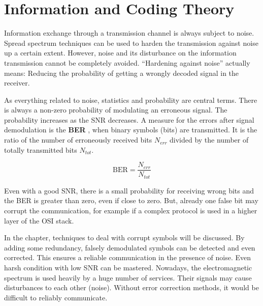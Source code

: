 %
%
%

\chapter{Information and Coding Theory}

\begin{refsection}

Information exchange through a transmission channel is always subject to noise. Spread spectrum techniques can be used to harden the transmission against noise up a certain extent. However, noise and its disturbance on the information transmission cannot be completely avoided. ``Hardening against noise'' actually means: Reducing the probability of getting a wrongly decoded signal in the receiver.

As everything related to noise, statistics and probability are central terms. There is always a non-zero probability of modulating an erroneous signal. The probability increases as the \ac{SNR} decreases. A measure for the errors after signal demodulation is the \textbf{\acf{BER}} , when binary symbols (bits) are transmitted. It is the ratio of the number of erroneously received bits $N_{err}$ divided by the number of totally transmitted bits $N_{tot}$.

\begin{equation}
	\mathrm{BER} = \frac{N_{err}}{N_{tot}}
\end{equation}
%

Even with a good \ac{SNR}, there is a small probability for receiving wrong bits and the \ac{BER} is greater than zero, even if close to zero. But, already one false bit may corrupt the communication, for example if a complex protocol is used in a higher layer of the \ac{OSI} stack.

In the chapter, techniques to deal with corrupt symbols will be discussed. By adding some redundancy, falsely demodulated symbols can be detected and even corrected. This ensures a reliable communication in the presence of noise. Even harsh condition with low \ac{SNR} can be mastered. Nowadays, the electromagnetic spectrum is used heavily by a huge number of services. Their signals may cause disturbances to each other (noise). Without error correction methods, it would be difficult to reliably communicate.


\end{refsection}
